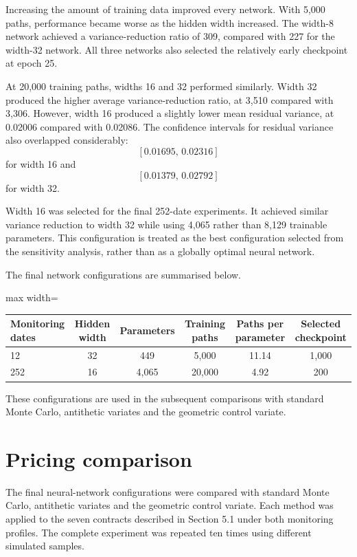 Increasing the amount of training data improved every network. With 5,000 paths, performance became worse as the hidden width increased. The width-8 network achieved a variance-reduction ratio of 309, compared with 227 for the width-32 network. All three networks also selected the relatively early checkpoint at epoch 25.

At 20,000 training paths, widths 16 and 32 performed similarly. Width 32 produced the higher average variance-reduction ratio, at 3,510 compared with 3,306. However, width 16 produced a slightly lower mean residual variance, at 0.02006 compared with 0.02086. The confidence intervals for residual variance also overlapped considerably:
\[
[0.01695,\,0.02316]
\]
for width 16 and
\[
[0.01379,\,0.02792]
\]
for width 32.

Width 16 was selected for the final 252-date experiments. It achieved similar variance reduction to width 32 while using 4,065 rather than 8,129 trainable parameters. This configuration is treated as the best configuration selected from the sensitivity analysis, rather than as a globally optimal neural network.

The final network configurations are summarised below.

\begin{table}[h]
\centering
\begin{adjustbox}{max width=\textwidth}
\begin{tabular}{lccccc}
\hline
Monitoring dates & Hidden width & Parameters & Training paths & Paths per parameter & Selected checkpoint \\
\hline
12 & 32 & 449 & 5,000 & 11.14 & 1,000 \\
252 & 16 & 4,065 & 20,000 & 4.92 & 200 \\
\hline
\end{tabular}
\end{adjustbox}
\end{table}

These configurations are used in the subsequent comparisons with standard Monte Carlo, antithetic variates and the geometric control variate.

\section{Pricing comparison}

The final neural-network configurations were compared with standard Monte Carlo, antithetic variates and the geometric control variate. Each method was applied to the seven contracts described in Section 5.1 under both monitoring profiles. The complete experiment was repeated ten times using different simulated samples.

